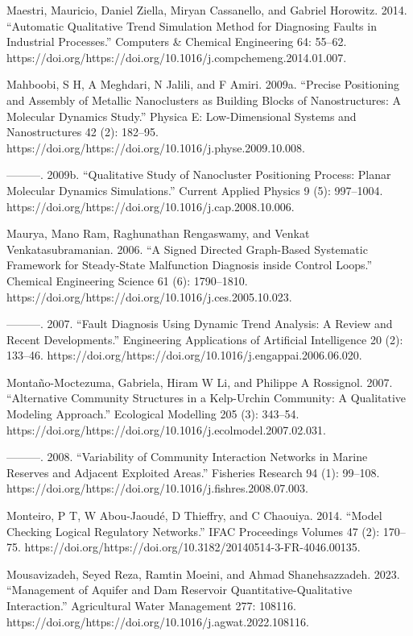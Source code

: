 \documentclass[utf8]{gradu3}
\begin{document}
Maestri, Mauricio, Daniel Ziella, Miryan Cassanello, and Gabriel Horowitz. 2014. “Automatic Qualitative Trend Simulation Method for Diagnosing Faults in Industrial Processes.” Computers \& Chemical Engineering 64: 55–62. https://doi.org/https://doi.org/10.1016/j.compchemeng.2014.01.007.

Mahboobi, S H, A Meghdari, N Jalili, and F Amiri. 2009a. “Precise Positioning and Assembly of Metallic Nanoclusters as Building Blocks of Nanostructures: A Molecular Dynamics Study.” Physica E: Low-Dimensional Systems and Nanostructures 42 (2): 182–95. https://doi.org/https://doi.org/10.1016/j.physe.2009.10.008.

———. 2009b. “Qualitative Study of Nanocluster Positioning Process: Planar Molecular Dynamics Simulations.” Current Applied Physics 9 (5): 997–1004. https://doi.org/https://doi.org/10.1016/j.cap.2008.10.006.

Maurya, Mano Ram, Raghunathan Rengaswamy, and Venkat Venkatasubramanian. 2006. “A Signed Directed Graph-Based Systematic Framework for Steady-State Malfunction Diagnosis inside Control Loops.” Chemical Engineering Science 61 (6): 1790–1810. https://doi.org/https://doi.org/10.1016/j.ces.2005.10.023.

———. 2007. “Fault Diagnosis Using Dynamic Trend Analysis: A Review and Recent Developments.” Engineering Applications of Artificial Intelligence 20 (2): 133–46. https://doi.org/https://doi.org/10.1016/j.engappai.2006.06.020.

Montaño-Moctezuma, Gabriela, Hiram W Li, and Philippe A Rossignol. 2007. “Alternative Community Structures in a Kelp-Urchin Community: A Qualitative Modeling Approach.” Ecological Modelling 205 (3): 343–54. https://doi.org/https://doi.org/10.1016/j.ecolmodel.2007.02.031.

———. 2008. “Variability of Community Interaction Networks in Marine Reserves and Adjacent Exploited Areas.” Fisheries Research 94 (1): 99–108. https://doi.org/https://doi.org/10.1016/j.fishres.2008.07.003.

Monteiro, P T, W Abou-Jaoudé, D Thieffry, and C Chaouiya. 2014. “Model Checking Logical Regulatory Networks.” IFAC Proceedings Volumes 47 (2): 170–75. https://doi.org/https://doi.org/10.3182/20140514-3-FR-4046.00135.

Mousavizadeh, Seyed Reza, Ramtin Moeini, and Ahmad Shanehsazzadeh. 2023. “Management of Aquifer and Dam Reservoir Quantitative-Qualitative Interaction.” Agricultural Water Management 277: 108116. https://doi.org/https://doi.org/10.1016/j.agwat.2022.108116.
\end{document}
